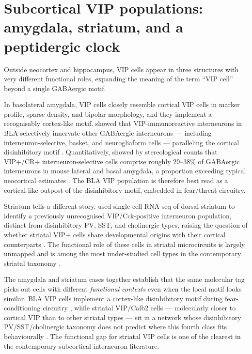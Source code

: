 \documentclass[11pt]{article}
\begin{document}
\section{Subcortical VIP populations: amygdala, striatum, and a peptidergic clock}

Outside neocortex and hippocampus, VIP cells appear in three structures with very different functional roles, expanding the meaning of the term ``VIP cell'' beyond a single GABAergic motif.

In basolateral amygdala, VIP cells closely resemble cortical VIP cells in marker profile, sparse density, and bipolar morphology, and they implement a recognisably cortex-like motif. \citet{Rhomberg2018} showed that VIP-immunoreactive interneurons in BLA selectively innervate other GABAergic interneurons --- including interneuron-selective, basket, and neurogliaform cells --- paralleling the cortical disinhibitory motif \citep{Rhomberg2018, Pi2013}. Quantitatively, \citet{Vereczki2021} showed by stereological counts that VIP+/CR+ interneuron-selective cells comprise roughly 29--38\% of GABAergic interneurons in mouse lateral and basal amygdala, a proportion exceeding typical neocortical estimates \citep{Vereczki2021}. The BLA VIP population is therefore best read as a cortical-like outpost of the disinhibitory motif, embedded in fear/threat circuitry.

Striatum tells a different story. \citet{Munozmanchado2018} used single-cell RNA-seq of dorsal striatum to identify a previously unrecognised VIP/Cck-positive interneuron population, distinct from disinhibitory PV, SST, and cholinergic types, raising the question of whether striatal VIP+ cells share developmental origins with their cortical counterparts \citep{Munozmanchado2018}. The functional role of these cells in striatal microcircuits is largely unmapped and is among the most under-studied cell types in the contemporary striatal taxonomy \citep{Munozmanchado2018}.

The amygdala and striatum cases together establish that the same molecular tag picks out cells with different \textit{functional contexts} even when the local motif looks similar. BLA VIP cells implement a cortex-like disinhibitory motif during fear-conditioning circuitry \citep{Rhomberg2018, Vereczki2021}, while striatal VIP/Calb2 cells --- molecularly closer to cortical VIP than to other striatal types --- sit in a network whose disinhibitory PV/SST/cholinergic taxonomy does not predict where this fourth class fits behaviourally \citep{Miyoshi2010}. The functional gap for striatal VIP cells is one of the clearest in the contemporary subcortical interneuron literature.
\end{document}
